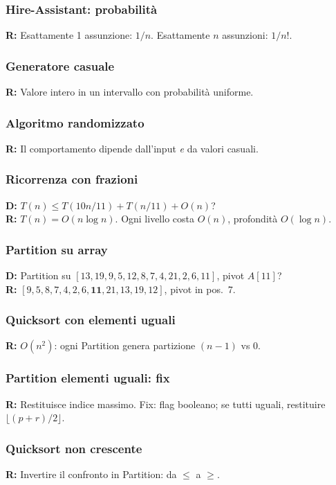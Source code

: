 \subsubsection*{Hire-Assistant: probabilità}
\textbf{R:} Esattamente 1 assunzione: $1/n$. Esattamente $n$ assunzioni:
$1/n!$.

\subsubsection*{Generatore casuale}
\textbf{R:} Valore intero in un intervallo con probabilità uniforme.

\subsubsection*{Algoritmo randomizzato}
\textbf{R:} Il comportamento dipende dall'input \emph{e} da valori casuali.

\subsubsection*{Ricorrenza con frazioni}
\textbf{D:} $T(n)\le T(10n/11)+T(n/11)+O(n)$?\\
\textbf{R:} $T(n) = O(n\log n)$. Ogni livello costa $O(n)$, profondità
$O(\log n)$.

\subsubsection*{Partition su array}
\textbf{D:} Partition su $[13,19,9,5,12,8,7,4,21,2,6,11]$, pivot $A[11]$?\\
\textbf{R:} $[9,5,8,7,4,2,6,\mathbf{11},21,13,19,12]$, pivot in pos.\ 7.

\subsubsection*{Quicksort con elementi uguali}
\textbf{R:} $O(n^2)$: ogni Partition genera partizione $(n{-}1)$ vs $0$.

\subsubsection*{Partition elementi uguali: fix}
\textbf{R:} Restituisce indice massimo. Fix: flag booleano; se tutti uguali,
restituire $\lfloor(p+r)/2\rfloor$.

\subsubsection*{Quicksort non crescente}
\textbf{R:} Invertire il confronto in Partition: da $\le$ a $\ge$.

